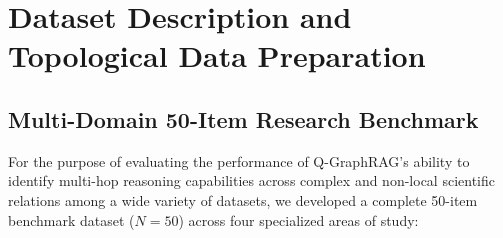 \documentclass{llncs}
\begin{document}
\section{Dataset Description and Topological Data Preparation}\label{sec:dataset_and_preprocessing}

\subsection{Multi-Domain 50-Item Research Benchmark}
For the purpose of evaluating the performance of Q-GraphRAG's ability to identify multi-hop reasoning capabilities across complex and non-local scientific relations among a wide variety of datasets, we developed a complete 50-item benchmark dataset ($N=50$) across four specialized areas of study:
\end{document}
